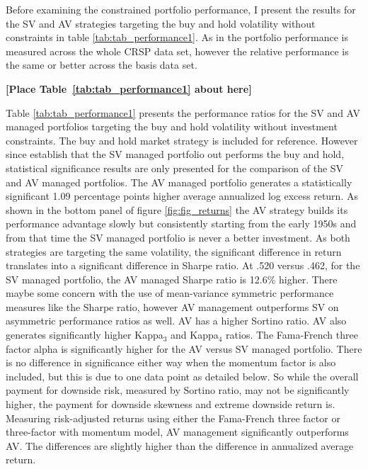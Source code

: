 Before examining the constrained portfolio performance, I present the results for the SV and AV strategies targeting the buy and hold volatility without constraints in table \ref{tab:tab_performance1}. As in \citet{moreira_volatility-managed_2017} the portfolio performance is measured across the whole CRSP data set, however the relative performance is the same or better across the basis data set. 

\bigskip
\centerline{\bf [Place Table~\ref{tab:tab_performance1} about here]}
\bigskip

Table \ref{tab:tab_performance1} presents the performance ratios for the SV and AV managed portfolios targeting the buy and hold volatility without investment constraints. The buy and hold market strategy is included for reference. However since \citet{moreira_volatility-managed_2017} establish that the SV managed portfolio out performs the buy and hold, statistical significance results are only presented for the comparison of the SV and AV managed portfolios. The AV managed portfolio generates a statistically significant 1.09 percentage points higher average annualized log excess return. As shown in the bottom panel of figure \ref{fig:fig_returns} the AV strategy builds its performance advantage slowly but consistently starting from the early 1950s and from that time the SV managed portfolio is never a better investment. As both strategies are targeting the same volatility, the significant difference in return translates into a significant difference in Sharpe ratio. At .520 versus .462, for the SV managed portfolio, the AV managed Sharpe ratio is 12.6\% higher. There maybe some concern with the use of mean-variance symmetric performance measures like the Sharpe ratio, however AV management outperforms SV on asymmetric performance ratios as well. AV has a higher Sortino ratio. AV also generates significantly higher Kappa$_{3}$ and Kappa$_{4}$ ratios. The Fama-French three factor alpha is significantly higher for the AV versus SV managed portfolio. There is no difference in significance either way when the momentum factor is also included, but this is due to one data point as detailed below. So while the overall payment for downside risk, measured by Sortino ratio, may not be significantly higher, the payment for downside skewness and extreme downside return is. Measuring risk-adjusted returns using either the Fama-French three factor or three-factor with momentum model, AV management significantly outperforms AV. The differences are slightly higher than the difference in annualized average return.%

